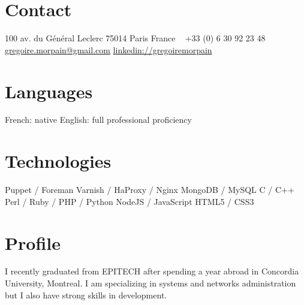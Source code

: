 \documentclass[print]{gmorpain-cv} %
\begin{document}


\begin{aside} %
\section{Contact}
100 av. du Général Leclerc
75014 Paris
France
~
+33 (0) 6 30 92 23 48
~
\href{mailto:gregoire.morpain@gmail.com}{gregoire.morpain@gmail.com}
\href{https://www.linkedin.com/in/gregoiremorpain/en}{linkedin://gregoiremorpain}
\section{Languages}
French: native
English: full professional proficiency
\section{Technologies}
Puppet / Foreman
Varnish / HaProxy / Nginx
MongoDB / MySQL
C / C++
Perl / Ruby / PHP / Python
NodeJS / JavaScript
HTML5 / CSS3
\end{aside}


\section{Profile}
{I recently graduated from EPITECH after spending a year abroad in Concordia University, Montreal. I am specializing in systems and networks administration but I also have strong skills in development.}

\end{document}
